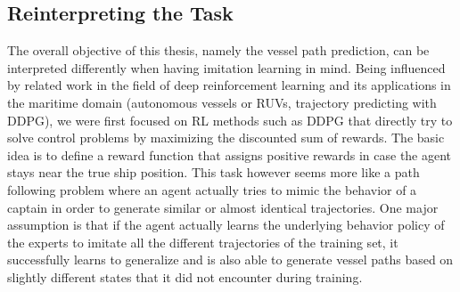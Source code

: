 \subsection{Reinterpreting the Task} \label{subchap:reinterpreting}
The overall objective of this thesis, namely the vessel path prediction, can be interpreted differently when having imitation learning in mind. Being influenced by related work in the field of deep reinforcement learning and its applications in the maritime domain (autonomous vessels or RUVs, trajectory predicting with DDPG), we were first focused on RL methods such as DDPG that directly try to solve control problems by maximizing the discounted sum of rewards. The basic idea is to define a reward function that assigns positive rewards in case the agent stays near the true ship position. This task however seems more like a path following problem where an agent actually tries to mimic the behavior of a captain in order to generate similar or almost identical trajectories. One major assumption is that if the agent actually learns the underlying behavior policy of the experts to imitate all the different trajectories of the training set, it successfully learns to generalize and is also able to generate vessel paths based on slightly different states that it did not encounter during training.